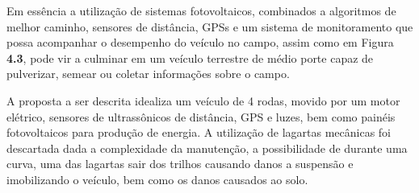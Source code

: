 Em essência a utilização de sistemas fotovoltaicos, combinados a algoritmos de melhor caminho, sensores de distância, GPSs e um sistema de monitoramento que possa acompanhar o desempenho do veículo no campo, assim como em Figura \textbf{4.3}, pode vir a culminar em um veículo terrestre de médio porte capaz de pulverizar, semear ou coletar informações sobre o campo.

A proposta a ser descrita idealiza um veículo de 4 rodas, movido por um  motor elétrico, sensores de ultrassônicos de distância, GPS e luzes, bem como painéis fotovoltaicos para produção de energia. A utilização de lagartas mecânicas foi descartada dada a complexidade da manutenção, a possibilidade de durante uma curva, uma das lagartas sair dos trilhos causando danos a suspensão e imobilizando o veículo, bem como os danos causados ao solo. 

